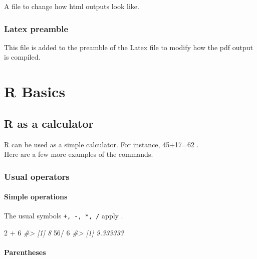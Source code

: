 \documentclass[]{book}
\newenvironment{Shaded}{}{}
\newcommand{\CommentTok}[1]{\textcolor[rgb]{0.38,0.63,0.69}{\textit{#1}}}
\newcommand{\DecValTok}[1]{\textcolor[rgb]{0.25,0.63,0.44}{#1}}
\newcommand{\OperatorTok}[1]{\textcolor[rgb]{0.40,0.40,0.40}{#1}}
\newcommand{\StringTok}[1]{\textcolor[rgb]{0.25,0.44,0.63}{#1}}
\theoremstyle{definition}
\theoremstyle{definition}
\theoremstyle{definition}
\theoremstyle{remark}
\begin{document}
A file to change how html outputs look like.

\hypertarget{latex-preamble}{%
\section{Latex preamble}\label{latex-preamble}}

This file is added to the preamble of the Latex file to modify how the
pdf output is compiled.

\hypertarget{part-r-basics}{%
\part{R Basics}\label{part-r-basics}}

\hypertarget{r-as-a-calculator}{%
\chapter{R as a calculator}\label{r-as-a-calculator}}

R can be used as a simple calculator. For instance, 45+17=62 .\\
Here are a few more examples of the commands.

\hypertarget{usual-operators}{%
\section{Usual operators}\label{usual-operators}}

\hypertarget{simple-operations}{%
\subsection{Simple operations}\label{simple-operations}}

The usual symbols \texttt{+,\ -,\ *,\ /} apply .

\begin{Shaded}
\begin{Highlighting}[]
\DecValTok{2} \OperatorTok{+}\StringTok{ }\DecValTok{6}
\CommentTok{#> [1] 8}
\DecValTok{56}\OperatorTok{/}\StringTok{ }\DecValTok{6}
\CommentTok{#> [1] 9.333333}
\end{Highlighting}
\end{Shaded}

\hypertarget{parentheses}{%
\subsection{Parentheses}\label{parentheses}}
\end{document}
